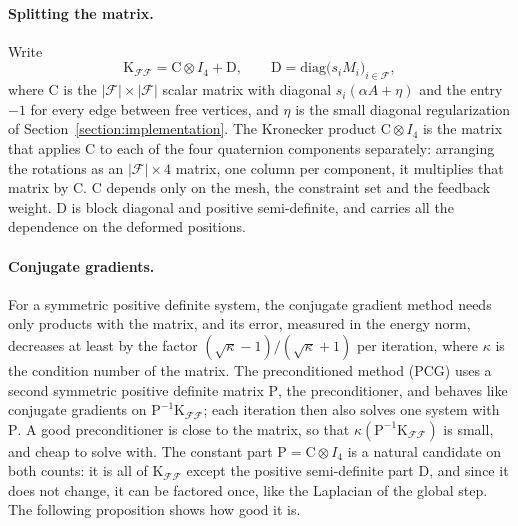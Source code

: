 \documentclass{birkjour}
\theoremstyle{remark}
\numberwithin{equation}{section}
\begin{document}
\paragraph{Splitting the matrix.} Write
\begin{equation}
\label{eq:K_split}
\mathrm K_{\mathcal F \mathcal F} = \mathrm C \otimes I_4 + \mathrm D,
\qquad
\mathrm D = \mathrm{diag}\big( s_i M_i \big)_{i \in \mathcal F},
\end{equation}
where $\mathrm C$ is the $|\mathcal F| \times |\mathcal F|$ scalar matrix with diagonal $s_i (\alpha A + \eta)$ and the entry $-1$ for every edge between free vertices, and $\eta$ is the small diagonal regularization of Section~\ref{section:implementation}. The Kronecker product $\mathrm C \otimes I_4$ is the matrix that applies $\mathrm C$ to each of the four quaternion components separately: arranging the rotations as an $|\mathcal F| \times 4$ matrix, one column per component, it multiplies that matrix by $\mathrm C$. $\mathrm C$ depends only on the mesh, the constraint set and the feedback weight. $\mathrm D$ is block diagonal and positive semi-definite, and carries all the dependence on the deformed positions.

\paragraph{Conjugate gradients.} For a symmetric positive definite system, the conjugate gradient method needs only products with the matrix, and its error, measured in the energy norm, decreases at least by the factor $(\sqrt{\kappa} - 1)/(\sqrt{\kappa} + 1)$ per iteration, where $\kappa$ is the condition number of the matrix. The preconditioned method (PCG) uses a second symmetric positive definite matrix $\mathrm P$, the preconditioner, and behaves like conjugate gradients on $\mathrm P^{-1} \mathrm K_{\mathcal F \mathcal F}$; each iteration then also solves one system with $\mathrm P$. A good preconditioner is close to the matrix, so that $\kappa(\mathrm P^{-1} \mathrm K_{\mathcal F \mathcal F})$ is small, and cheap to solve with. The constant part $\mathrm P = \mathrm C \otimes I_4$ is a natural candidate on both counts: it is all of $\mathrm K_{\mathcal F \mathcal F}$ except the positive semi-definite part $\mathrm D$, and since it does not change, it can be factored once, like the Laplacian of the global step. The following proposition shows how good it is.
\end{document}
